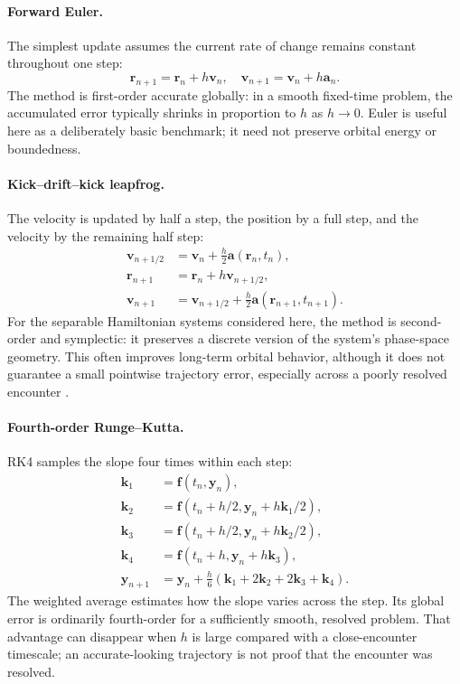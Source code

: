 \documentclass[10pt,letterpaper,twocolumn]{article}
\begin{document}
\paragraph{Forward Euler.} The simplest update assumes the current rate of change remains constant throughout one step:
\begin{equation}
 \boldsymbol r_{n+1}=\boldsymbol r_n+h\boldsymbol v_n,\quad
 \boldsymbol v_{n+1}=\boldsymbol v_n+h\boldsymbol a_n.
\end{equation}
The method is first-order accurate globally: in a smooth fixed-time problem, the accumulated error typically shrinks in proportion to $h$ as $h\to0$. Euler is useful here as a deliberately basic benchmark; it need not preserve orbital energy or boundedness.

\paragraph{Kick--drift--kick leapfrog.} The velocity is updated by half a step, the position by a full step, and the velocity by the remaining half step:
\begin{align}
 \boldsymbol v_{n+1/2}&=\boldsymbol v_n+\tfrac h2\boldsymbol a(\boldsymbol r_n,t_n),\\
 \boldsymbol r_{n+1}&=\boldsymbol r_n+h\boldsymbol v_{n+1/2},\\
 \boldsymbol v_{n+1}&=\boldsymbol v_{n+1/2}+\tfrac h2
 \boldsymbol a(\boldsymbol r_{n+1},t_{n+1}).
\end{align}
For the separable Hamiltonian systems considered here, the method is second-order and symplectic: it preserves a discrete version of the system's phase-space geometry. This often improves long-term orbital behavior, although it does not guarantee a small pointwise trajectory error, especially across a poorly resolved encounter \cite{hairer2006geometric,wisdom1991symplectic}.

\paragraph{Fourth-order Runge--Kutta.} RK4 samples the slope four times within each step:
\begin{align}
 \boldsymbol k_1&=\boldsymbol f(t_n,\boldsymbol y_n),\\
 \boldsymbol k_2&=\boldsymbol f(t_n+h/2,\boldsymbol y_n+h\boldsymbol k_1/2),\\
 \boldsymbol k_3&=\boldsymbol f(t_n+h/2,\boldsymbol y_n+h\boldsymbol k_2/2),\\
 \boldsymbol k_4&=\boldsymbol f(t_n+h,\boldsymbol y_n+h\boldsymbol k_3),\\
 \boldsymbol y_{n+1}&=\boldsymbol y_n+\tfrac h6
 (\boldsymbol k_1+2\boldsymbol k_2+2\boldsymbol k_3+\boldsymbol k_4).
\end{align}
The weighted average estimates how the slope varies across the step. Its global error is ordinarily fourth-order for a sufficiently smooth, resolved problem. That advantage can disappear when $h$ is large compared with a close-encounter timescale; an accurate-looking trajectory is not proof that the encounter was resolved.
\end{document}

